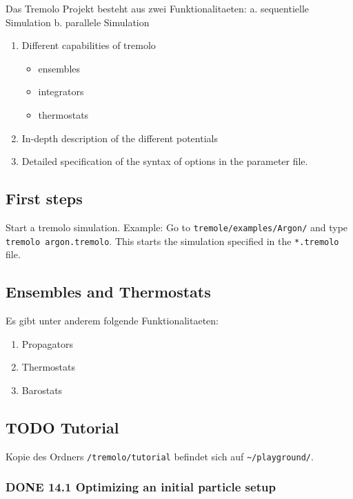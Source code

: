 \documentclass[11pt]{article}
\begin{document}
Das Tremolo Projekt besteht aus zwei Funktionalitaeten:
a. sequentielle Simulation 
b. parallele Simulation

\begin{enumerate}
\item Different capabilities of tremolo

\begin{itemize}
\item ensembles
\item integrators
\item thermostats
\end{itemize}

\item In-depth description of the different potentials
\item Detailed specification of the syntax of options in the parameter file.
\end{enumerate}
\subsection{First steps}
\label{sec-2.2}

Start a tremolo simulation. Example:
Go to \texttt{tremole/examples/Argon/} and type \texttt{tremolo argon.tremolo}. This starts the simulation specified in the \texttt{*.tremolo} file. 

\subsection{Ensembles and Thermostats}
\label{sec-2.3}

Es gibt unter anderem folgende Funktionalitaeten:
\begin{enumerate}
\item Propagators
\item Thermostats
\item Barostats
\end{enumerate}
\subsection{\textbf{TODO} Tutorial}
\label{sec-2.4}

     Kopie des Ordners \texttt{/tremolo/tutorial} befindet sich auf \texttt{\textasciitilde{}/playground/}. 

\subsubsection{\textbf{DONE} 14.1 Optimizing an initial particle setup}
\label{sec-2.4.1}
\end{document}
